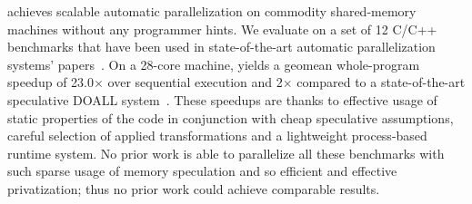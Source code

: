 \name achieves scalable automatic parallelization on commodity
shared-memory machines without any programmer hints.  We evaluate
\name on a set of 12 C/C++ benchmarks that have been used in
state-of-the-art automatic parallelization systems'
papers~\cite{johnson:12:pldi,kim:12:cgo,campanoni:12:cgo}. On a
28-core machine, \name yields a geomean whole-program speedup of
23.0$\times$ over sequential execution and 2$\times$ compared to a
state-of-the-art speculative DOALL system~\cite{johnson:12:pldi}.
These speedups are thanks to effective usage of static properties of
the code in conjunction with cheap speculative assumptions,
%
careful selection of applied transformations and a lightweight
process-based runtime system.  No prior work is able to parallelize
all these benchmarks with such sparse usage of memory speculation and
so efficient and effective privatization; thus no prior work could
achieve comparable results.
